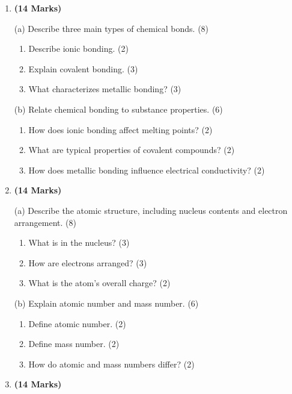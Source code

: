 \documentclass[12pt]{article}
\newenvironment{questionblock}[1][10]{
    \par\Needspace{#1\baselineskip}
}{
    \par
}
\begin{document}
\begin{enumerate}[start=3]
  \begin{questionblock}[15]
    \item \textbf{(14 Marks)}

    (a) Describe three main types of chemical bonds. (8)
    \begin{enumerate}[label=(\roman*)]
      \item Describe ionic bonding. (2)
      \item Explain covalent bonding. (3)
      \item What characterizes metallic bonding? (3)
    \end{enumerate}

    (b) Relate chemical bonding to substance properties. (6)
    \begin{enumerate}[label=(\roman*)]
      \item How does ionic bonding affect melting points? (2)
      \item What are typical properties of covalent compounds? (2)
      \item How does metallic bonding influence electrical conductivity? (2)
    \end{enumerate}
  \end{questionblock}

  \begin{questionblock}[15]
    \item \textbf{(14 Marks)}

    (a) Describe the atomic structure, including nucleus contents and electron arrangement. (8)
    \begin{enumerate}[label=(\roman*)]
      \item What is in the nucleus? (3)
      \item How are electrons arranged? (3)
      \item What is the atom's overall charge? (2)
    \end{enumerate}

    (b) Explain atomic number and mass number. (6)
    \begin{enumerate}[label=(\roman*)]
      \item Define atomic number. (2)
      \item Define mass number. (2)
      \item How do atomic and mass numbers differ? (2)
    \end{enumerate}
  \end{questionblock}

  \begin{questionblock}[15]
    \item \textbf{(14 Marks)}


\end{questionblock}
\end{enumerate}
\end{document}
